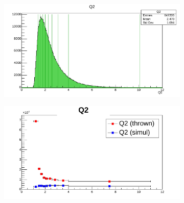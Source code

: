    \begin{figure}[hbtp]
        \begin{subfigure}{.5\textwidth}
            \centering
            \includegraphics[width=\linewidth]{13dataanalysis/img/40_accbins_q2.pdf}
            \label{fig::acc_corr_bins_q2}
        \end{subfigure}
        \begin{subfigure}{.5\textwidth}
            \centering
            \includegraphics[width=\linewidth]{13dataanalysis/img/40_acccorr_q2.pdf}
            \label{fig::acc_corr_q2}
        \end{subfigure}


\end{figure}
